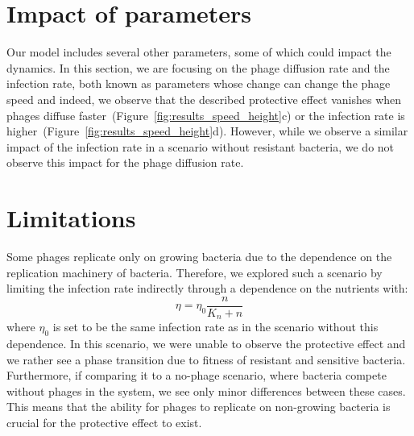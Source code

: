 \section{Impact of parameters}
Our model includes several other parameters, some of which could impact the dynamics. In this section, we are focusing on the phage diffusion rate and the infection rate, both known as parameters whose change can change the phage speed and indeed, we observe that the described protective effect vanishes when phages diffuse faster~(Figure~\ref{fig:results_speed_height}c) or the infection rate is higher~(Figure~\ref{fig:results_speed_height}d). However, while we observe a similar impact of the infection rate in a scenario without resistant bacteria, we do not observe this impact for the phage diffusion rate. 
\section{Limitations}
Some phages replicate only on growing bacteria due to the dependence on the replication machinery of bacteria. Therefore, we explored such a scenario by limiting the infection rate indirectly through a dependence on the nutrients with:
\begin{equation}
    \eta = \eta_0 \frac{n}{K_n + n}
\end{equation}
where $\eta_0$ is set to be the same infection rate as in the scenario without this dependence.
In this scenario, we were unable to observe the protective effect and we rather see a phase transition due to fitness of resistant and sensitive bacteria. Furthermore, if comparing it to a no-phage scenario, where bacteria compete without phages in the system, we see only minor differences between these cases.
This means that the ability for phages to replicate on non-growing bacteria is crucial for the protective effect to exist.





